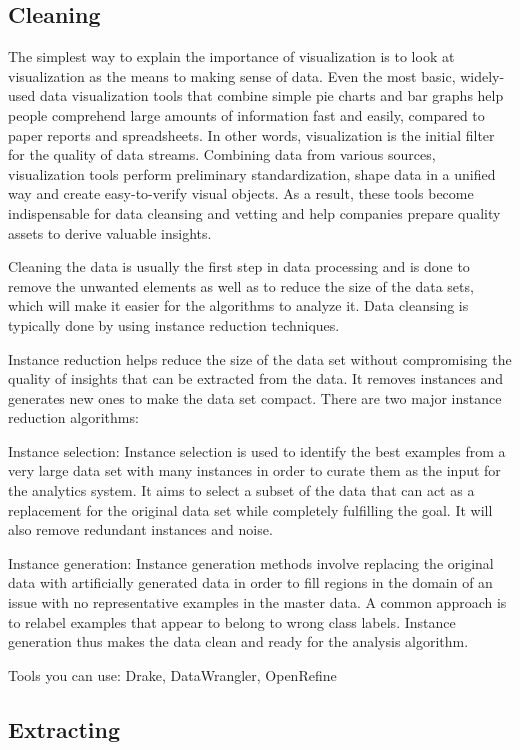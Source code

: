 \documentclass[]{book}
\theoremstyle{definition}
\theoremstyle{definition}
\theoremstyle{definition}
\theoremstyle{remark}
\begin{document}
\subsection{Cleaning}\label{cleaning}

The simplest way to explain the importance of visualization is to look
at visualization as the means to making sense of data. Even the most
basic, widely-used data visualization tools that combine simple pie
charts and bar graphs help people comprehend large amounts of
information fast and easily, compared to paper reports and spreadsheets.
In other words, visualization is the initial filter for the quality of
data streams. Combining data from various sources, visualization tools
perform preliminary standardization, shape data in a unified way and
create easy-to-verify visual objects. As a result, these tools become
indispensable for data cleansing and vetting and help companies prepare
quality assets to derive valuable insights.

Cleaning the data is usually the first step in data processing and is
done to remove the unwanted elements as well as to reduce the size of
the data sets, which will make it easier for the algorithms to analyze
it. Data cleansing is typically done by using instance reduction
techniques.

Instance reduction helps reduce the size of the data set without
compromising the quality of insights that can be extracted from the
data. It removes instances and generates new ones to make the data set
compact. There are two major instance reduction algorithms:

Instance selection: Instance selection is used to identify the best
examples from a very large data set with many instances in order to
curate them as the input for the analytics system. It aims to select a
subset of the data that can act as a replacement for the original data
set while completely fulfilling the goal. It will also remove redundant
instances and noise.

Instance generation: Instance generation methods involve replacing the
original data with artificially generated data in order to fill regions
in the domain of an issue with no representative examples in the master
data. A common approach is to relabel examples that appear to belong to
wrong class labels. Instance generation thus makes the data clean and
ready for the analysis algorithm.

Tools you can use: Drake, DataWrangler, OpenRefine

\subsection{Extracting}\label{extracting}
\end{document}
